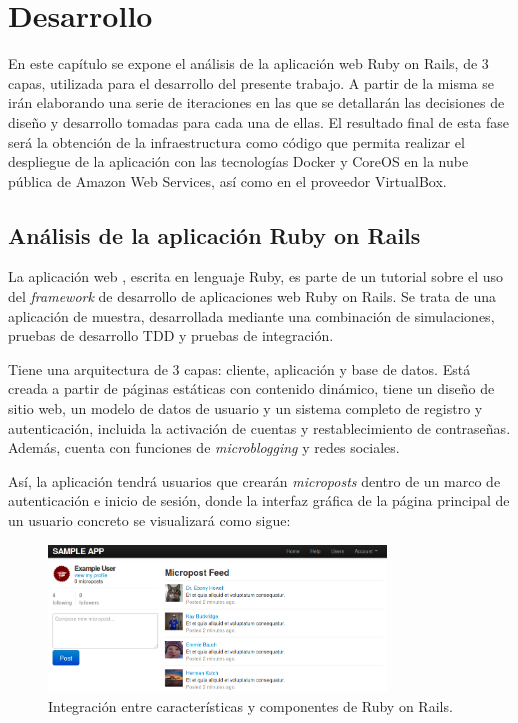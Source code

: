 \chapter{Desarrollo}
\label{cha:development}

En este capítulo se expone el análisis de la aplicación web Ruby on Rails, de 3 capas, utilizada para el desarrollo del presente trabajo. A partir de la misma se irán elaborando una serie de iteraciones en las que se detallarán las decisiones de diseño y desarrollo tomadas para cada una de ellas. El resultado final de esta fase será la obtención de la infraestructura como código que permita realizar el despliegue de la aplicación con las tecnologías Docker y CoreOS en la nube pública de Amazon Web Services, así como en el proveedor VirtualBox.

\section{Análisis de la aplicación Ruby on Rails}

La aplicación web , escrita en lenguaje Ruby, es parte de un tutorial sobre el uso del \textit{framework} de desarrollo de aplicaciones web Ruby on Rails. Se trata de una aplicación de muestra, desarrollada mediante una combinación de simulaciones, pruebas de desarrollo TDD y pruebas de integración. 

Tiene una arquitectura de 3 capas: cliente, aplicación y base de datos. Está creada a partir de páginas estáticas con contenido dinámico, tiene un diseño de sitio web, un modelo de datos de usuario y un sistema completo de registro y autenticación, incluida la activación de cuentas y restablecimiento de contraseñas. Además, cuenta con funciones de \textit{microblogging} y redes sociales. 

Así, la aplicación tendrá usuarios que crearán \textit{microposts} dentro de un marco de autenticación e inicio de sesión, donde la interfaz gráfica de la página principal de un usuario concreto se visualizará como sigue:

\begin{figure}[H]
\centering
\includegraphics[width=0.8\textwidth]{images/figures/sampleapp.png}
\caption{Integración entre características y componentes de Ruby on Rails.}
\end{figure}

